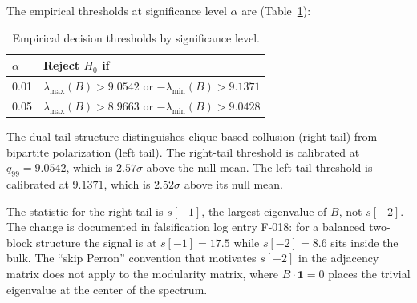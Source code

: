 \documentclass[11pt,a4paper]{article}
\numberwithin{equation}{section}
\numberwithin{table}{section}
\begin{document}
The empirical thresholds at significance level $\alpha$ are (Table~\ref{tab:thresholds}):

\begin{table}[H]
\centering
\caption{Empirical decision thresholds by significance level.}
\label{tab:thresholds}
\small
\begin{tabular}{ll}
\toprule
$\alpha$ & Reject $H_0$ if \\
\midrule
0.01 & $\lambda_{\max}(B) > 9.0542$ or $-\lambda_{\min}(B) > 9.1371$ \\
0.05 & $\lambda_{\max}(B) > 8.9663$ or $-\lambda_{\min}(B) > 9.0428$ \\
\bottomrule
\end{tabular}
\end{table}

The dual-tail structure distinguishes clique-based collusion (right tail) from bipartite polarization (left tail). The right-tail threshold is calibrated at $q_{99} = 9.0542$, which is $2.57\sigma$ above the null mean. The left-tail threshold is calibrated at $9.1371$, which is $2.52\sigma$ above its null mean.

The statistic for the right tail is $s[-1]$, the largest eigenvalue of $B$, not $s[-2]$. The change is documented in falsification log entry F-018: for a balanced two-block structure the signal is at $s[-1] = 17.5$ while $s[-2] = 8.6$ sits inside the bulk. The ``skip Perron'' convention that motivates $s[-2]$ in the adjacency matrix does not apply to the modularity matrix, where $B \cdot \mathbf{1} = 0$ places the trivial eigenvalue at the center of the spectrum.
\end{document}
